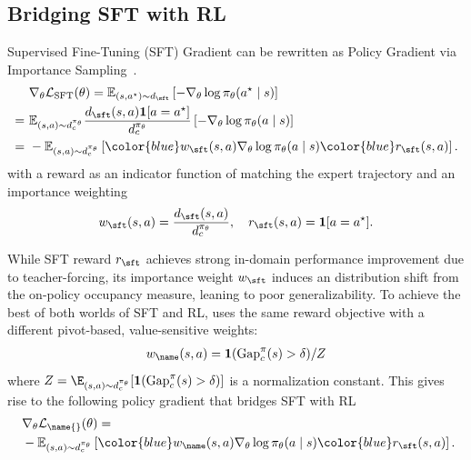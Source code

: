 \subsection{Bridging SFT with RL}

Supervised Fine-Tuning (SFT) Gradient can be rewritten as Policy Gradient via Importance Sampling~\citep{wu2025generalization}.
\begin{align*}
&~ \nabla_\theta \mathcal{L}_{\text{SFT}}(\theta) = \mathbb{E}_{(s, a^\star) \sim d_{\sft}} \left[ -\nabla_\theta \log \pi_\theta(a^\star \mid s) \right] \\
= &~ \mathbb{E}_{(s,a) \sim d^{\pi_\theta}_c} \frac{d_{\sft}(s,a)\mathbf{1}[a =a^\star]}{d^{\pi_\theta}_c} \left[ -\nabla_\theta \log \pi_\theta(a \mid s) \right] \\
= &~ -\mathbb{E}_{(s,a) \sim d^{\pi_\theta}_c} \left[ {\color{blue}w_{\sft}(s,a)} \nabla_\theta \log \pi_\theta(a \mid s) {\color{blue}r_{\sft}(s, a)} \right].
\end{align*}
with a reward as an indicator function of matching the expert trajectory and an importance weighting
\begin{align*}
w_{\sft}(s,a) = \frac{d_{\sft}(s,a)}{d^{\pi_\theta}_c}, \quad r_{\sft}(s, a) = \mathbf{1}[a =a^\star].
\end{align*}

While SFT reward $r_{\sft}$ achieves strong in-domain performance improvement due to teacher-forcing, its importance weight $w_{\sft}$ induces an distribution shift from the on-policy occupancy measure, leaning to poor generalizability.
To achieve the best of both worlds of SFT and RL, \name uses the same reward objective with a different pivot-based, value-sensitive weights:
\begin{align*}
w_{\name}(s,a) =\mathbf{1}(\mathrm{Gap}_c^\pi(s) > \delta)/Z
\end{align*}
where $Z = \E_{(s,a) \sim d^{\pi_\theta}_c}[\mathbf{1}(\mathrm{Gap}_c^\pi(s) > \delta)]$ is a normalization constant.
This gives rise to the following policy gradient that bridges SFT with RL
\begin{align*}
&~ \nabla_\theta \mathcal{L}_{\text{\name{}}}(\theta) = \\
&~ -\mathbb{E}_{(s,a) \sim d^{\pi_\theta}_c} \left[ {\color{blue}w_{\name}(s,a)} \nabla_\theta \log \pi_\theta(a \mid s) {\color{blue}r_{\sft}(s, a)} \right].
\end{align*}


